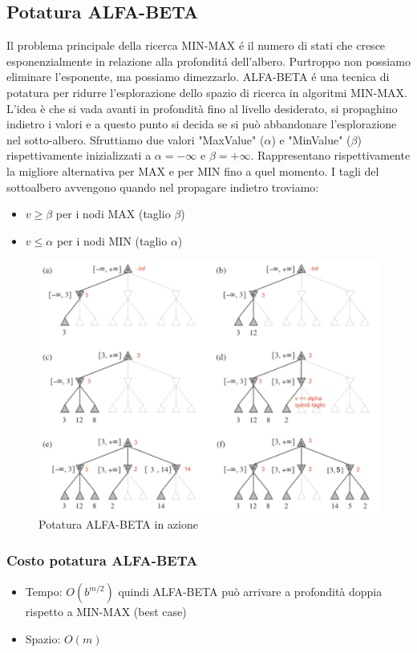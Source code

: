 \documentclass{article}
\begin{document}
\subsection{Potatura ALFA-BETA}
Il problema principale della ricerca MIN-MAX é il numero di stati che cresce esponenzialmente in relazione alla profonditá dell'albero. Purtroppo non possiamo eliminare l'esponente, ma possiamo dimezzarlo. \newline
ALFA-BETA é una tecnica di potatura per ridurre l’esplorazione dello spazio di ricerca in algoritmi MIN-MAX. L'idea è che si vada avanti in profondità fino al livello desiderato, si propaghino indietro i valori e a questo punto si decida se si può abbandonare l’esplorazione nel sotto-albero. Sfruttiamo due valori "MaxValue" ($\alpha$) e "MinValue" ($\beta$) rispettivamente inizializzati a $\alpha=-\infty$ e $\beta=+\infty$. Rappresentano rispettivamente la migliore alternativa per MAX e per MIN fino a quel momento. \newline
I tagli del sottoalbero avvengono quando nel propagare indietro troviamo: 
\begin{itemize}
    \item $v \geq \beta$ per i nodi MAX (taglio $\beta$)
    \item $v \leq \alpha$ per i nodi MIN (taglio $\alpha$) 
\end{itemize}
\begin{figure}[H]
\centering
\includegraphics[scale=0.74]{Images/esempioalpha-beta.png}
\caption{Potatura ALFA-BETA in azione}
\end{figure}
\clearpage

\subsubsection{Costo potatura ALFA-BETA}
\begin{itemize}
    \item Tempo: $O(b^{m/2})$ quindi ALFA-BETA può arrivare a profondità doppia rispetto a MIN-MAX (best case)
    \item Spazio: $O(m)$
\end{itemize}
\end{document}
